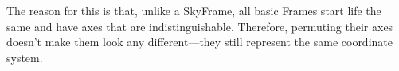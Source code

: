\documentclass[twoside,11pt]{starlink}
\providecommand{\secref}[1]{\S\ref{#1}}
\begin{document}
The reason for this is that, unlike a SkyFrame, all basic Frames start
life the same and have axes that are indistinguishable. Therefore,
permuting their axes doesn't make them look any different---they still
represent the same coordinate system.
%
%
%
%
%
%
\end{document}
